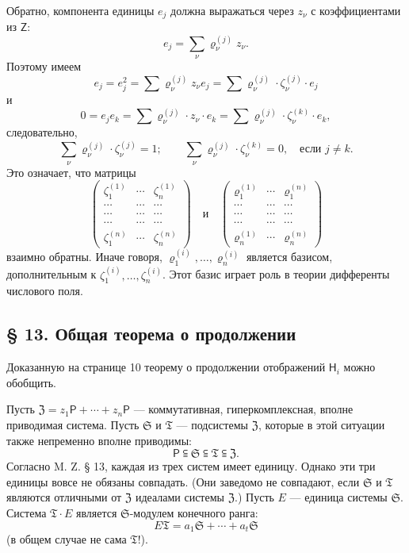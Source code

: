 \documentclass[11pt]{article}
\begin{document}
Обратно, компонента единицы \(e_j\) должна выражаться через \(z_\nu\) с коэффициентами из \(\mathsf Z\):
\[
e_j=\sum_\nu \varrho_\nu^{(j)}z_\nu .
\]
Поэтому имеем
\[
e_j=e_j^2=\sum \varrho_\nu^{(j)}z_\nu e_j
=\sum \varrho_\nu^{(j)}\cdot\zeta_\nu^{(j)}\cdot e_j
\]
и
\[
0=e_je_k=\sum \varrho_\nu^{(j)}\cdot z_\nu\cdot e_k
=\sum \varrho_\nu^{(j)}\cdot\zeta_\nu^{(k)}\cdot e_k,
\]
следовательно,
\[
\sum_\nu \varrho_\nu^{(j)}\cdot\zeta_\nu^{(j)}=1;
\qquad
\sum_\nu \varrho_\nu^{(j)}\cdot\zeta_\nu^{(k)}=0,\quad
\text{если } j\ne k.
\]
Это означает, что матрицы
\[
\begin{pmatrix}
\zeta_1^{(1)} & \cdots & \zeta_n^{(1)}\\
\cdots & \cdots & \cdots\\
\cdots & \cdots & \cdots\\
\cdots & \cdots & \cdots\\
\zeta_1^{(n)} & \cdots & \zeta_n^{(n)}
\end{pmatrix}
\quad\text{и}\quad
\begin{pmatrix}
\varrho_1^{(1)} & \cdots & \varrho_1^{(n)}\\
\cdots & \cdots & \cdots\\
\cdots & \cdots & \cdots\\
\cdots & \cdots & \cdots\\
\varrho_n^{(1)} & \cdots & \varrho_n^{(n)}
\end{pmatrix}
\]
взаимно обратны. Иначе говоря, \(\varrho_1^{(i)},\ldots,\varrho_n^{(i)}\) является базисом, дополнительным к \(\zeta_1^{(i)},\ldots,\zeta_n^{(i)}\). Этот базис играет роль в теории дифференты числового поля.

\subsection*{§ 13. Общая теорема о продолжении}\label{der-allgemeine-fortsetzungssatz}

Доказанную на странице 10 теорему о продолжении отображений \(\mathsf{H}_i\) можно обобщить.

Пусть \(\mathfrak Z=z_1\mathsf P+\cdots+z_n\mathsf P\) --- коммутативная, гиперкомплексная, вполне приводимая система. Пусть \(\mathfrak S\) и \(\mathfrak T\) --- подсистемы \(\mathfrak Z\), которые в этой ситуации также непременно вполне приводимы:
\[
\mathsf P\subseteqq\mathfrak S\subseteqq\mathfrak T\subseteqq\mathfrak Z .
\]
Согласно M. Z. § 13, каждая из трех систем имеет единицу. Однако эти три единицы вовсе не обязаны совпадать. (Они заведомо не совпадают, если \(\mathfrak S\) и \(\mathfrak T\) являются отличными от \(\mathfrak Z\) идеалами системы \(\mathfrak Z\).) Пусть \(E\) --- единица системы \(\mathfrak S\). Система \(\mathfrak T\cdot E\) является \(\mathfrak S\)-модулем конечного ранга:
\[
E\mathfrak T=a_1\mathfrak S+\cdots+a_t\mathfrak S
\]
(в общем случае не сама \(\mathfrak T\)!).
\end{document}
